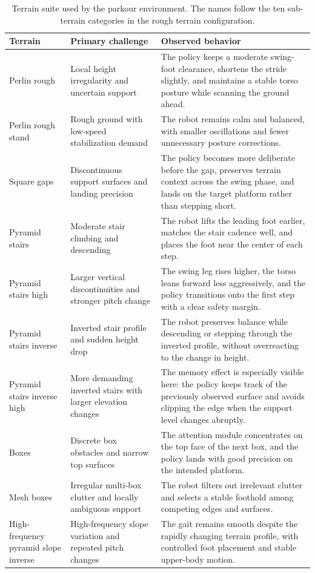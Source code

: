 \begin{table}[t]
\centering
\footnotesize
\begin{tabular}{@{}p{}p{}p{}@{}}
\toprule
\textbf{Terrain} & \textbf{Primary challenge} & \textbf{Observed behavior} \\
\midrule
Perlin rough & Local height irregularity and uncertain support & The policy keeps a moderate swing-foot clearance, shortens the stride slightly, and maintains a stable torso posture while scanning the ground ahead. \\
Perlin rough stand & Rough ground with low-speed stabilization demand & The robot remains calm and balanced, with smaller oscillations and fewer unnecessary posture corrections. \\
Square gaps & Discontinuous support surfaces and landing precision & The policy becomes more deliberate before the gap, preserves terrain context across the swing phase, and lands on the target platform rather than stepping short. \\
Pyramid stairs & Moderate stair climbing and descending & The robot lifts the leading foot earlier, matches the stair cadence well, and places the foot near the center of each step. \\
Pyramid stairs high & Larger vertical discontinuities and stronger pitch change & The swing leg rises higher, the torso leans forward less aggressively, and the policy transitions onto the first step with a clear safety margin. \\
Pyramid stairs inverse & Inverted stair profile and sudden height drop & The robot preserves balance while descending or stepping through the inverted profile, without overreacting to the change in height. \\
Pyramid stairs inverse high & More demanding inverted stairs with larger elevation changes & The memory effect is especially visible here: the policy keeps track of the previously observed surface and avoids clipping the edge when the support level changes abruptly. \\
Boxes & Discrete box obstacles and narrow top surfaces & The attention module concentrates on the top face of the next box, and the policy lands with good precision on the intended platform. \\
Mesh boxes & Irregular multi-box clutter and locally ambiguous support & The robot filters out irrelevant clutter and selects a stable foothold among competing edges and surfaces. \\
High-frequency pyramid slope inverse & High-frequency slope variation and repeated pitch changes & The gait remains smooth despite the rapidly changing terrain profile, with controlled foot placement and stable upper-body motion. \\
\bottomrule
\end{tabular}
\caption{Terrain suite used by the parkour environment. The names follow the ten sub-terrain categories in the rough terrain configuration.}
\label{tab:terrain_suite}
\end{table}

